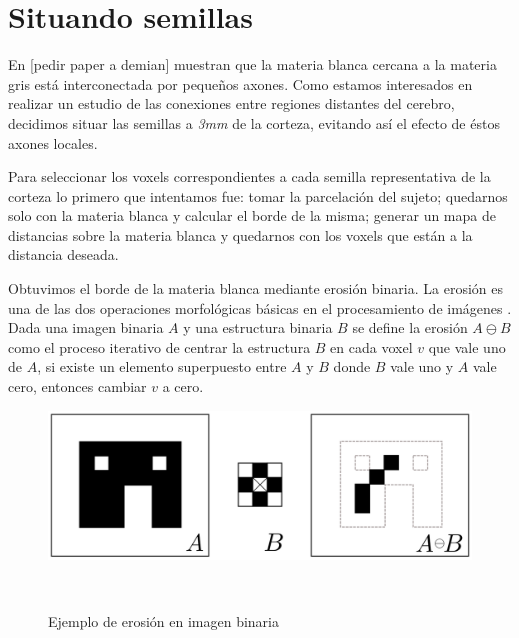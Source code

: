 \section{Situando semillas}

En [pedir paper a demian] muestran que la materia blanca cercana a la materia gris 
est\'a interconectada por peque\~nos axones. Como estamos interesados en realizar
un estudio de las conexiones entre regiones distantes del cerebro, decidimos
situar las semillas a \textit{3mm} de la corteza, evitando as\'i el efecto de
\'estos axones locales. 

Para seleccionar los voxels correspondientes a cada semilla representativa de la
corteza lo primero que intentamos fue: tomar la parcelaci\'on del sujeto; 
quedarnos solo con la materia blanca y calcular el borde de la misma; generar un
mapa de distancias sobre la materia blanca y quedarnos con los voxels que est\'an
a la distancia deseada. 

Obtuvimos el borde de la materia blanca mediante erosi\'on binaria. La erosi\'on
es una de las dos operaciones morfol\'ogicas b\'asicas en el procesamiento de
im\'agenes \cite{Serra1983}. Dada una imagen binaria $A$ y una estructura binaria
$B$ se define la erosi\'on $ A \ominus B $ como el proceso iterativo de centrar
la estructura $B$ en cada voxel $v$ que vale uno de $A$, si existe un elemento
superpuesto entre $A$ y $B$ donde $B$ vale uno y $A$ vale cero, entonces cambiar
$v$ a cero. \\

\begin{figure}[h!]
                                                                                                                        
\begin{minipage}[b]{\textwidth}
    \includegraphics[width=\textwidth]{img/erosion.png}
    \caption{Ejemplo de erosi\'on en imagen binaria}
\end{minipage} ~

\end{figure}  

